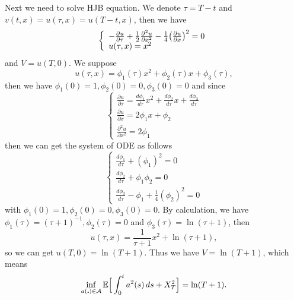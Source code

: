 \documentclass[12pt,a4paper]{ctexart}
\begin{document}
Next we need to solve HJB equation. We denote $\tau = T -t$ and $v(t, x) = u(\tau, x) = u(T - t, x)$, then we have
\begin{equation*}
\left\{
             \begin{array}{l}
             - \frac{\partial u}{\partial \tau} + \frac{1}{2} \frac{\partial^{2} u}{\partial x^{2}} - \frac{1}{4} \big{(} \frac{\partial u}{\partial x}\big{)}^{2} = 0 \\
             u(\tau, x) = x^{2}
             \end{array}
\right.
\end{equation*}
and $V = u(T, 0)$. We suppose
\begin{equation*}
    u(\tau, x) = \phi_{1} (\tau) x^{2} +  \phi_{2} (\tau) x + \phi_{3} (\tau),
\end{equation*}
then we have $\phi_{1} (0) = 1, \phi_{2} (0) = 0, \phi_{3} (0) = 0$ and since 
\begin{equation*}
\left\{
    \begin{array}{l}
        \frac{\partial u}{\partial \tau} = \frac{d \phi_{1}}{d \tau} x^{2} + \frac{d \phi_{2}}{d \tau} x + \frac{d \phi_{3}}{d \tau} \\
        \frac{\partial u}{\partial x} = 2 \phi_{1} x + \phi_{2} \\
        \frac{\partial^{2} u}{\partial x^{2}} = 2 \phi_{1}
    \end{array}
\right.
\end{equation*}
then we can get the system of ODE as follows
\begin{equation*}
\left\{
    \begin{array}{l}
        \frac{d \phi_{1}}{d \tau} + (\phi_{1})^{2} = 0 \\
        \frac{d \phi_{2}}{d \tau} + \phi_{1} \phi_{2} = 0 \\
        \frac{d \phi_{3}}{d \tau} - \phi_{1} + \frac{1}{4} (\phi_{2})^{2} = 0
    \end{array}
\right.
\end{equation*}
with $\phi_{1} (0) = 1, \phi_{2} (0) = 0, \phi_{3} (0) = 0$. By calculation, we have $\phi_{1} (\tau) = (\tau + 1)^{-1}, \phi_{2} (\tau) = 0$ and $\phi_{3} (\tau) = \ln (\tau + 1)$, then
\begin{equation*}
    u(\tau, x) = \frac{1}{\tau + 1} x^{2} + \ln (\tau + 1),
\end{equation*}
so we can get $u(T, 0) = \ln (T + 1)$. Thus we have $V = \ln (T + 1)$, which means 
\begin{equation*}
 \inf_{a(\centerdot) \in \mathcal{A}} \mathbb{E} \Big{[} \int_{0}^{t} a^{2} (s) \, d s + X_{T}^{2} \Big{]} = \ln (T + 1).
\end{equation*}
\end{document}
